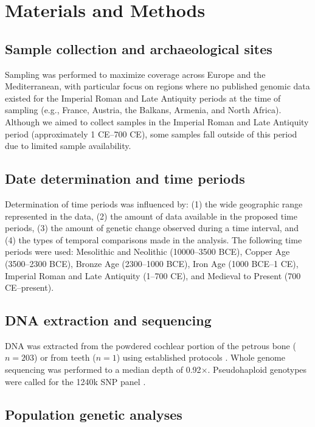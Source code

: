 \documentclass[11pt]{article}
\begin{document}
\section{Materials and Methods}

\subsection{Sample collection and archaeological sites}

Sampling was performed to maximize coverage across Europe and the Mediterranean, with particular focus on regions where no published genomic data existed for the Imperial Roman and Late Antiquity periods at the time of sampling (e.g., France, Austria, the Balkans, Armenia, and North Africa). Although we aimed to collect samples in the Imperial Roman and Late Antiquity period (approximately 1 CE--700 CE), some samples fall outside of this period due to limited sample availability.

\subsection{Date determination and time periods}

Determination of time periods was influenced by: (1) the wide geographic range represented in the data, (2) the amount of data available in the proposed time periods, (3) the amount of genetic change observed during a time interval, and (4) the types of temporal comparisons made in the analysis. The following time periods were used: Mesolithic and Neolithic (10000--3500 BCE), Copper Age (3500--2300 BCE), Bronze Age (2300--1000 BCE), Iron Age (1000 BCE--1 CE), Imperial Roman and Late Antiquity (1--700 CE), and Medieval to Present (700 CE--present).

\subsection{DNA extraction and sequencing}

DNA was extracted from the powdered cochlear portion of the petrous bone ($n = 203$) or from teeth ($n = 1$) using established protocols \citep{dabney2013, rohland2015}. Whole genome sequencing was performed to a median depth of 0.92$\times$. Pseudohaploid genotypes were called for the 1240k SNP panel \citep{mathieson2015}.

\subsection{Population genetic analyses}
\end{document}
